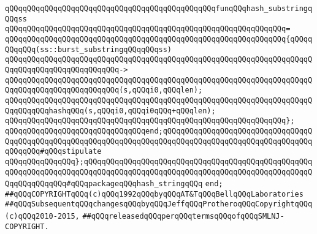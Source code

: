 \verb|qQQqqQQqqQQqqQQqqQQqqQQqqQQqqQQqqQQqqQQqqQQqqQQqfunqQQqhash_substringqQQqss|\newline
\verb|qQQqqQQqqQQqqQQqqQQqqQQqqQQqqQQqqQQqqQQqqQQqqQQqqQQqqQQqqQQqqQQq=|\newline
\verb|qQQqqQQqqQQqqQQqqQQqqQQqqQQqqQQqqQQqqQQqqQQqqQQqqQQqqQQqqQQqqQQq{qQQqqQQqqQQq(ss::burst_substringqQQqqQQqss)|\newline
\verb|qQQqqQQqqQQqqQQqqQQqqQQqqQQqqQQqqQQqqQQqqQQqqQQqqQQqqQQqqQQqqQQqqQQqqQQqqQQqqQQqqQQqqQQqqQQqqQQq->|\newline
\verb|qQQqqQQqqQQqqQQqqQQqqQQqqQQqqQQqqQQqqQQqqQQqqQQqqQQqqQQqqQQqqQQqqQQqqQQqqQQqqQQqqQQqqQQqqQQqqQQq(s,qQQqi0,qQQqlen);|\newline
\newline
\verb|qQQqqQQqqQQqqQQqqQQqqQQqqQQqqQQqqQQqqQQqqQQqqQQqqQQqqQQqqQQqqQQqqQQqqQQqqQQqqQQqhashqQQq(s,qQQqi0,qQQqi0qQQq+qQQqlen);|\newline
\verb|qQQqqQQqqQQqqQQqqQQqqQQqqQQqqQQqqQQqqQQqqQQqqQQqqQQqqQQqqQQqqQQq};|\newline
\verb|qQQqqQQqqQQqqQQqqQQqqQQqqQQqqQQqend;qQQqqQQqqQQqqQQqqQQqqQQqqQQqqQQqqQQqqQQqqQQqqQQqqQQqqQQqqQQqqQQqqQQqqQQqqQQqqQQqqQQqqQQqqQQqqQQqqQQqqQQqqQQqqQQq#qQQqstipulate|\newline
\newline
\verb|qQQqqQQqqQQqqQQq};qQQqqQQqqQQqqQQqqQQqqQQqqQQqqQQqqQQqqQQqqQQqqQQqqQQqqQQqqQQqqQQqqQQqqQQqqQQqqQQqqQQqqQQqqQQqqQQqqQQqqQQqqQQqqQQqqQQqqQQqqQQqqQQqqQQqqQQq#qQQqpackageqQQqhash_stringqQQq|\newline
\verb|end;|\newline
\newline
\verb|##qQQqCOPYRIGHTqQQq(c)qQQq1992qQQqbyqQQqAT&TqQQqBellqQQqLaboratories|\newline
\verb|##qQQqSubsequentqQQqchangesqQQqbyqQQqJeffqQQqProtheroqQQqCopyrightqQQq(c)qQQq2010-2015,|\newline
\verb|##qQQqreleasedqQQqperqQQqtermsqQQqofqQQqSMLNJ-COPYRIGHT.|\newline

